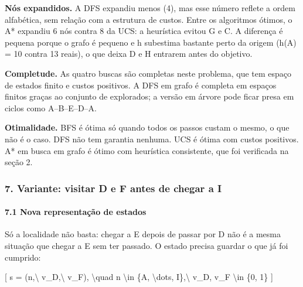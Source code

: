 \documentclass[12pt, a4paper]{article}
\begin{document}
\textbf{Nós expandidos.} A DFS expandiu menos (4), mas esse número reflete a ordem alfabética, sem relação com a estrutura de custos. Entre os algoritmos ótimos, o A* expandiu 6 nós contra 8 da UCS: a heurística evitou G e C. A diferença é pequena porque o grafo é pequeno e h subestima bastante perto da origem (h(A) = 10 contra 13 reais), o que deixa D e H entrarem antes do objetivo.

\textbf{Completude.} As quatro buscas são completas neste problema, que tem espaço de estados finito e custos positivos. A DFS em grafo é completa em espaços finitos graças ao conjunto de explorados; a versão em árvore pode ficar presa em ciclos como A--B--E--D--A.

\textbf{Otimalidade.} BFS é ótima só quando todos os passos custam o mesmo, o que não é o caso. DFS não tem garantia nenhuma. UCS é ótima com custos positivos. A* em busca em grafo é ótimo com heurística consistente, que foi verificada na seção 2.

\subsubsection{7. Variante: visitar D e F antes de chegar a I}\label{7-variante-visitar-d-e-f-antes-de-chegar-a-i}

\paragraph{7.1 Nova representação de estados}\label{71-nova-representauxe7uxe3o-de-estados}

Só a localidade não basta: chegar a E depois de passar por D não é a mesma situação que chegar a E sem ter passado. O estado precisa guardar o que já foi cumprido:

{[} s = (n,\textbackslash{} v\_D,\textbackslash{} v\_F), \textbackslash quad n \textbackslash in \{A, \textbackslash dots, I\},\textbackslash{} v\_D, v\_F \textbackslash in \{0, 1\} {]}
\end{document}
